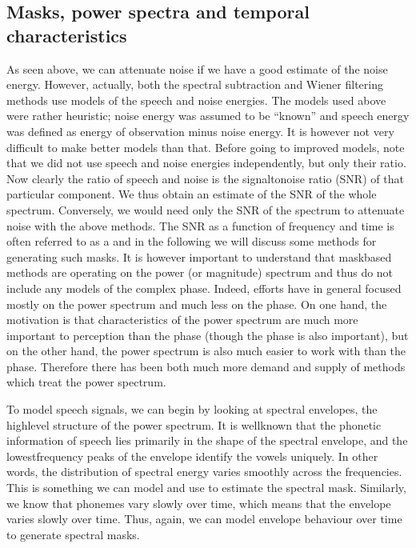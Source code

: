 \documentclass[letterpaper,10pt,english]{jupyterBook}
\begin{document}
\subsection{Masks, power spectra and temporal characteristics}
\label{\detokenize{Enhancement/Noise_attenuation:masks-power-spectra-and-temporal-characteristics}}
\sphinxAtStartPar
As seen above, we can attenuate noise if we have a good estimate of the
noise energy. However, actually, both the spectral subtraction and
Wiener filtering methods use models of the speech and noise energies.
The models used above were rather heuristic; noise energy was assumed to
be “known” and speech energy was defined as energy of observation minus
noise energy. It is however not very difficult to make better models
than that. Before going to improved models, note that we did not use
speech and noise energies independently, but only their ratio. Now
clearly the ratio of speech and noise is the signal\sphinxhyphen{}to\sphinxhyphen{}noise ratio (SNR)
of that particular component. We thus obtain an estimate of the SNR of
the whole spectrum. Conversely, we would need only the SNR of the
spectrum to attenuate noise with the above methods. The SNR as a
function of frequency and time is often referred to as a  and in
the following we will discuss some methods for generating such masks. It
is however important to understand that mask\sphinxhyphen{}based methods are operating
on the power (or magnitude) spectrum and thus do not include any models
of the complex phase. Indeed, efforts have in general focused mostly on
the power spectrum and much less on the phase. On one hand, the
motivation is that characteristics of the power spectrum are much more
important to perception than the phase (though the phase is also
important), but on the other hand, the power spectrum is also much
easier to work with than the phase. Therefore there has been both much
more demand and supply of methods which treat the power spectrum.

\sphinxAtStartPar
To model speech signals, we can begin by looking at spectral envelopes,
the high\sphinxhyphen{}level structure of the power spectrum. It is well\sphinxhyphen{}known that
the phonetic information of speech lies primarily in the shape of the
spectral envelope, and the lowest\sphinxhyphen{}frequency peaks of the envelope
identify the vowels uniquely. In other words, the distribution of
spectral energy varies smoothly across the frequencies. This is
something we can model and use to estimate the spectral mask. Similarly,
we know that phonemes vary slowly over time, which means that the
envelope varies slowly over time. Thus, again, we can model envelope
behaviour over time to generate spectral masks.
\end{document}
